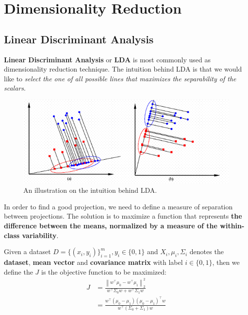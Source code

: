\documentclass[a4paper, 12pt]{book} %
\begin{document}
\chapter{Dimensionality Reduction}
\section{Linear Discriminant Analysis}
\textbf{Linear Discriminant Analysis} or \textbf{LDA} is most commonly used as dimensionality reduction technique. The intuition behind LDA is that we would like to \emph{select the one of all possible lines that maximizes the separability of the scalars}.

\begin{figure}[htpb]
	\centering
	\includegraphics[width=\linewidth]{figures/lda.png}
	\caption{An illustration on the intuition behind LDA.}
	\label{fig:boat1}
\end{figure}

In order to find a good projection, we need to define a measure of separation between projections. The solution is to maximize a function that represents \textbf{the difference between the means, normalized by a measure of the within-class variability}.

Given a dataset $D=\{(x_i,y_i)\}_{i=1}^m,y_i \in \{0,1\}$ and $X_i, \mu_i, \Sigma_i$ denotes the \textbf{dataset}, \textbf{mean vector} and \textbf{covariance matrix} with label $i \in \{0,1\}$, then we define the $J$ is the objective function to be maximized: 
\begin{equation}
	\begin{split}
	J&=\frac{\left\lVert w^\top \mu_0-w^\top \mu_1 \right\lVert_2^2}{w^\top \Sigma_0w + w^\top \Sigma_1w} \\
	 &=\frac{w^\top (\mu_0-\mu_1)(\mu_0-\mu_1)^\top w}{w^\top (\Sigma_0 + \Sigma_1) w}
	\end{split}
\end{equation}
\end{document}
